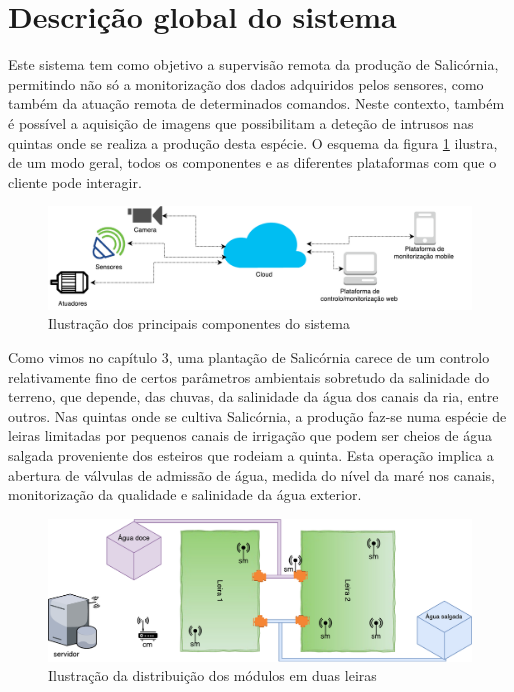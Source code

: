 \section{Descrição global do sistema}

Este sistema tem como objetivo a supervisão remota da produção de Salicórnia, permitindo não só a monitorização dos dados adquiridos pelos sensores, como também da atuação remota de determinados comandos. Neste contexto, também é possível a aquisição de imagens que possibilitam a deteção de intrusos nas quintas onde se realiza a produção desta espécie. O esquema da figura \ref{componentesalla} ilustra, de um modo geral, todos os componentes e as diferentes plataformas com que o cliente pode interagir. 


\begin{figure}[!htb]
	\centering
	\includegraphics[width=\linewidth]{esquemas/global_arquitetura.pdf}
	\caption{Ilustração dos principais componentes do sistema}
	\label{componentesalla}
\end{figure}






Como vimos no capítulo 3, uma plantação de  Salicórnia carece de um controlo relativamente fino de certos parâmetros ambientais sobretudo da salinidade do terreno, que depende, das chuvas, da salinidade da água dos canais da ria, entre outros. Nas quintas onde se cultiva Salicórnia, a produção faz-se numa espécie de leiras limitadas por pequenos canais de irrigação que podem ser cheios de água salgada proveniente dos esteiros que rodeiam a quinta. Esta operação implica a abertura de válvulas de admissão de água, medida do nível da maré nos canais, monitorização da qualidade e salinidade da água exterior.



\begin{figure}[!htb]
	\centering
	\includegraphics[width=\linewidth]{esquemas/leiras-comm-geral.pdf}
	\caption{Ilustração da distribuição dos módulos em duas leiras}
	\label{leira}
\end{figure}


